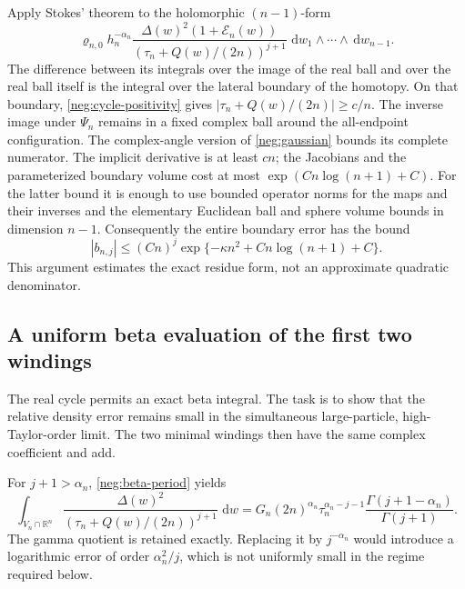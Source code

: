 \documentclass[11pt]{article}
\numberwithin{equation}{section}
\theoremstyle{definition}
\newcommand{\R}{\mathbb R}
\newcommand{\dd}{\,\mathrm d}
\begin{document}
Apply Stokes' theorem to the holomorphic \((n-1)\)-form
\[
 \varrho_{n,0}h_n^{-\alpha_n}
 \frac{\Delta(w)^2(1+\mathcal E_n(w))}
      {(\tau_n+Q(w)/(2n))^{j+1}}
       \,\dd w_1\wedge\cdots\wedge\dd w_{n-1}.
 \]
The difference between its integrals over the image of the
real ball and over the real ball itself is the integral over
the lateral boundary of the homotopy.  On that boundary,
\eqref{neg:cycle-positivity} gives
\(|\tau_n+Q(w)/(2n)|\ge c/n\).
The inverse image under \(\Psi_n\) remains in a fixed
complex ball around the all-endpoint configuration.  The
complex-angle version of \eqref{neg:gaussian} bounds its
complete numerator.  The implicit derivative is at least
\(cn\); the Jacobians and the parameterized boundary volume
cost at most \(\exp(Cn\log(n+1)+C)\).
For the latter bound it is enough to use bounded operator
norms for the maps and their inverses and the elementary
Euclidean ball and sphere volume bounds in dimension \(n-1\).
Consequently the entire boundary error has the bound
\begin{equation}
 |b_{n,j}|\le
 (Cn)^j\exp\{-\kappa n^2+C n\log(n+1)+C\}.
 \label{neg:cycle-error}
\end{equation}
This argument estimates the exact residue form, not an
approximate quadratic denominator.

\subsection{A uniform beta evaluation of the first two windings}
\label{neg:beta-evaluation}

The real cycle permits an exact beta integral. The task is to show
that the relative density error remains small in the simultaneous
large-particle, high-Taylor-order limit. The two minimal windings
then have the same complex coefficient and add.

For \(j+1>\alpha_n\), \eqref{neg:beta-period} yields
\begin{equation}
 \int_{V_n\cap\R^n}
 \frac{\Delta(w)^2}
      {(\tau_n+Q(w)/(2n))^{j+1}}\,\dd w
 =
 G_n(2n)^{\alpha_n}\tau_n^{\alpha_n-j-1}
       \frac{\Gamma(j+1-\alpha_n)}{\Gamma(j+1)}.
 \label{neg:first-beta}
\end{equation}
The gamma quotient is retained exactly.  Replacing it by
\(j^{-\alpha_n}\) would introduce a logarithmic error of
order \(\alpha_n^2/j\), which is not uniformly small in
the regime required below.
\end{document}
